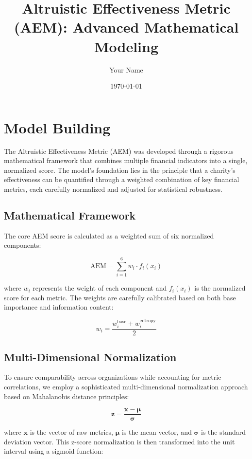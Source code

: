 \documentclass[12pt]{article}
\title{Altruistic Effectiveness Metric (AEM): Advanced Mathematical Modeling}
\author{Your Name}
\date{\today}
\begin{document}
\maketitle

\section{Model Building}

The Altruistic Effectiveness Metric (AEM) was developed through a rigorous mathematical framework that combines multiple financial indicators into a single, normalized score. The model's foundation lies in the principle that a charity's effectiveness can be quantified through a weighted combination of key financial metrics, each carefully normalized and adjusted for statistical robustness.

\subsection{Mathematical Framework}

The core AEM score is calculated as a weighted sum of six normalized components:

\begin{equation}
    \text{AEM} = \sum_{i=1}^{6} w_i \cdot f_i(x_i)
\end{equation}

where $w_i$ represents the weight of each component and $f_i(x_i)$ is the normalized score for each metric. The weights are carefully calibrated based on both base importance and information content:

\begin{equation}
    w_i = \frac{w_i^{\text{base}} + w_i^{\text{entropy}}}{2}
\end{equation}

\subsection{Multi-Dimensional Normalization}

To ensure comparability across organizations while accounting for metric correlations, we employ a sophisticated multi-dimensional normalization approach based on Mahalanobis distance principles:

\begin{equation}
    \bm{z} = \frac{\bm{x} - \bm{\mu}}{\bm{\sigma}}
\end{equation}

where $\bm{x}$ is the vector of raw metrics, $\bm{\mu}$ is the mean vector, and $\bm{\sigma}$ is the standard deviation vector. This z-score normalization is then transformed into the unit interval using a sigmoid function:
\end{document}
